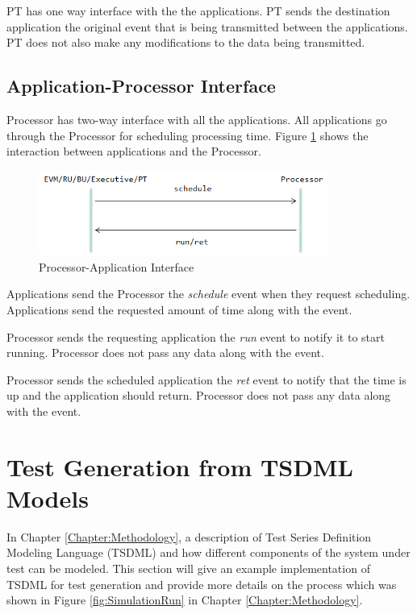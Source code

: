 PT has one way interface with the the applications. PT sends the destination application the original event that is being transmitted between the applications. PT does not also make any modifications to the data being transmitted.

\subsection{Application-Processor Interface}

Processor has two-way interface with all the applications. All applications go through the Processor for scheduling processing time. Figure \ref{fig:processor-app} shows the interaction between applications and the Processor.

\begin{figure}
	\centering
		\includegraphics[width=0.85\textwidth]{figures/processor-app.png}
	\caption{Processor-Application Interface}
	\label{fig:processor-app}
\end{figure}

Applications send the Processor the \textit{schedule} event when they request scheduling. Applications send the requested amount of time along with the event.

Processor sends the requesting application the \textit{run} event to notify it to start running. Processor does not pass any data along with the event.

Processor sends the scheduled application the \textit{ret} event to notify that the time is up and the application should return. Processor does not pass any data along with the event. 

\section{Test Generation from TSDML Models}
In Chapter \ref{Chapter:Methodology}, a description of Test Series Definition Modeling Language (TSDML) and how different components of the system under test can be modeled. This section will give an example implementation of TSDML for test generation and provide more details on the process which was shown in Figure \ref{fig:SimulationRun} in Chapter \ref{Chapter:Methodology}.

